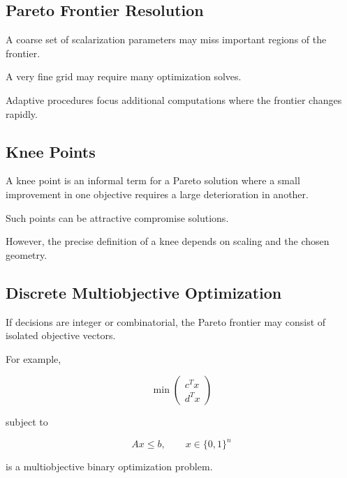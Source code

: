 \subsection{Pareto Frontier Resolution}
\label{subsec:pareto-frontier-resolution}

A coarse set of scalarization parameters may miss important regions of the
frontier.

A very fine grid may require many optimization solves.

Adaptive procedures focus additional computations where the frontier
changes rapidly.

\subsection{Knee Points}
\label{subsec:knee-points}

A knee point is an informal term for a Pareto solution where a small
improvement in one objective requires a large deterioration in another.

Such points can be attractive compromise solutions.

However, the precise definition of a knee depends on scaling and the
chosen geometry.

\subsection{Discrete Multiobjective Optimization}
\label{subsec:discrete-multiobjective-optimization}

If decisions are integer or combinatorial, the Pareto frontier may consist
of isolated objective vectors.

For example,

\[
\boxed{
\min
\begin{pmatrix}
c^Tx\\
d^Tx
\end{pmatrix}
}
\]

subject to

\[
\boxed{
Ax\leq b,
\qquad
x\in\{0,1\}^n
}
\]

is a multiobjective binary optimization problem.


